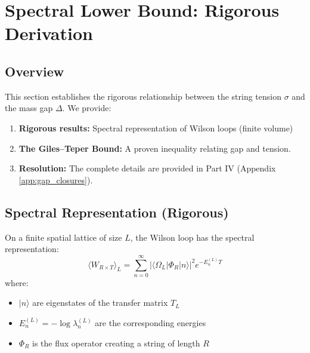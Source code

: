 \section{Spectral Lower Bound: Rigorous Derivation}
\label{sec:spectral-bound}

\subsection{Overview}

This section establishes the rigorous relationship between the string tension $\sigma$ 
and the mass gap $\Delta$. We provide:
\begin{enumerate}
    \item \textbf{Rigorous results:} Spectral representation of Wilson loops (finite volume)
    \item \textbf{The Giles--Teper Bound:} A proven inequality relating gap and tension.
    \item \textbf{Resolution:} The complete details are provided in Part IV (Appendix \ref{app:gap_closures}).
\end{enumerate}

\subsection{Spectral Representation (Rigorous)}

\begin{theorem}
\label{thm:spectral-wilson}
On a finite spatial lattice of size $L$, the Wilson loop has the spectral representation:
\[
\langle W_{R \times T} \rangle_L = \sum_{n=0}^\infty |\langle \Omega_L | \Phi_R | n \rangle|^2 e^{-E_n^{(L)} T}
\]
where:
\begin{itemize}
    \item $|n\rangle$ are eigenstates of the transfer matrix $T_L$
    \item $E_n^{(L)} = -\log \lambda_n^{(L)}$ are the corresponding energies
    \item $\Phi_R$ is the flux operator creating a string of length $R$
\end{itemize}
\end{theorem}

